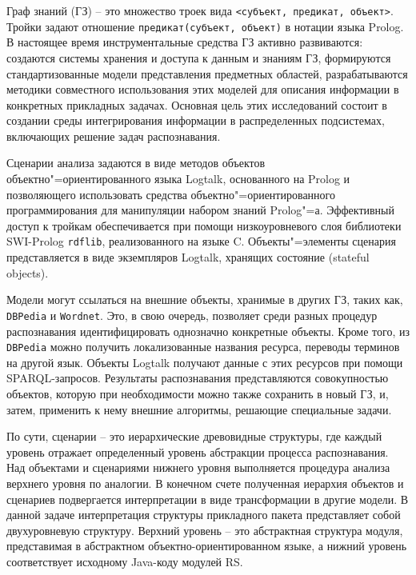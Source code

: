 \documentclass[12pt]{article}
\begin{document}
Граф знаний (ГЗ) -- это множество троек вида \texttt{<субъект, предикат, объект>}.  Тройки задают отношение \texttt{предикат(субъект, объект)} в нотации языка Prolog.  В настоящее время инструментальные средства ГЗ активно развиваются: создаются системы хранения и доступа к данным и знаниям ГЗ, формируются стандартизованные модели представления предметных областей, разрабатываются методики совместного использования этих моделей для описания информации в конкретных прикладных задачах.  Основная цель этих исследований состоит в создании среды интегрирования информации в распределенных подсистемах, включающих решение задач распознавания.

Сценарии анализа задаются в виде методов объектов объектно"=ориентированного языка Logtalk, основанного на Prolog и позволяющего использовать средства объектно"=ориентированного программирования для манипуляции набором знаний Prolog"=а. Эффективный доступ к тройкам обеспечивается при помощи низкоуровневого слоя библиотеки SWI-Prolog \texttt{rdflib}, реализованного на языке C.  Объекты"=элементы сценария представляется в виде экземпляров Logtalk, хранящих состояние (stateful objects).

Модели могут ссылаться на внешние объекты, хранимые в других ГЗ, таких как, \texttt{DBPedia} и \texttt{Wordnet}.  Это, в свою очередь, позволяет среди разных процедур распознавания идентифицировать однозначно конкретные объекты.  Кроме того, из \texttt{DBPedia} можно получить локализованные названия ресурса, переводы терминов на другой язык.  Объекты Logtalk получают данные с этих ресурсов при помощи SPARQL-запросов.  Результаты распознавания представляются совокупностью объектов, которую при необходимости можно также сохранить в новый ГЗ, и, затем, применить к нему внешние алгоритмы, решающие специальные задачи.

По сути, сценарии -- это иерархические древовидные структуры, где каждый уровень отражает определенный уровень абстракции процесса распознавания.  Над объектами и сценариями нижнего уровня выполняется процедура анализа верхнего уровня по аналогии.  В конечном счете полученная иерархия объектов и сценариев подвергается интерпретации в виде трансформации в другие модели.  В данной задаче интерпретация структуры прикладного пакета представляет собой двухуровневую структуру. Верхний уровень -- это абстрактная структура модуля, представимая в абстрактном объектно-ориентированном языке, а нижний уровень соответствует исходному Java-коду модулей RS.
\end{document}
